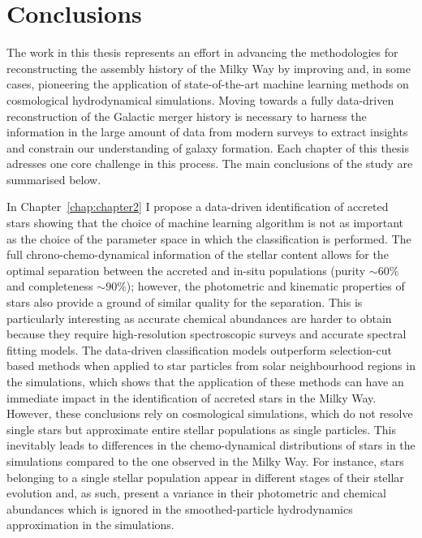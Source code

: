 \chapter{Conclusions}
\label{chap:conclusions}

The work in this thesis represents an effort in advancing the methodologies for 
reconstructing the assembly history of the Milky Way by improving and, in some cases,
pioneering the application of state-of-the-art machine learning methods on
cosmological hydrodynamical simulations.  
Moving towards a fully data-driven reconstruction of the Galactic merger history is necessary to
harness the information in the large amount of data from modern surveys to extract
insights and constrain our understanding of galaxy formation.   
Each chapter of this thesis adresses one core challenge in this process. The main conclusions
of the study are summarised below.

\bigskip

In Chapter~\ref{chap:chapter2} I propose a data-driven identification of accreted stars showing that
the choice of machine learning algorithm is not as important as the choice of the parameter space in which the classification is performed. 
The full chrono-chemo-dynamical
information of the stellar content allows for the optimal separation between the accreted and in-situ 
populations (purity $\sim60\%$ and completeness $\sim90\%$); however, the photometric and kinematic
properties of stars also provide a ground of similar quality for the separation. This is
particularly interesting as accurate chemical abundances are harder to obtain because they require
high-resolution spectroscopic surveys and accurate spectral fitting models.
The data-driven classification models outperform selection-cut based methods
when applied to star particles from solar neighbourhood regions in the simulations, which shows that the application of these
methods can have an immediate impact in the identification of accreted stars in the Milky Way.
However, these conclusions rely on cosmological simulations, which do not resolve 
single stars but approximate entire stellar populations as single particles. 
This inevitably leads to differences in the chemo-dynamical distributions of stars in the
simulations compared to the one observed in the Milky Way. For instance, stars belonging to a single stellar population 
appear in different stages of their stellar evolution and, as such, present a variance in their photometric and chemical abundances 
which is ignored in the smoothed-particle hydrodynamics approximation in the simulations.


